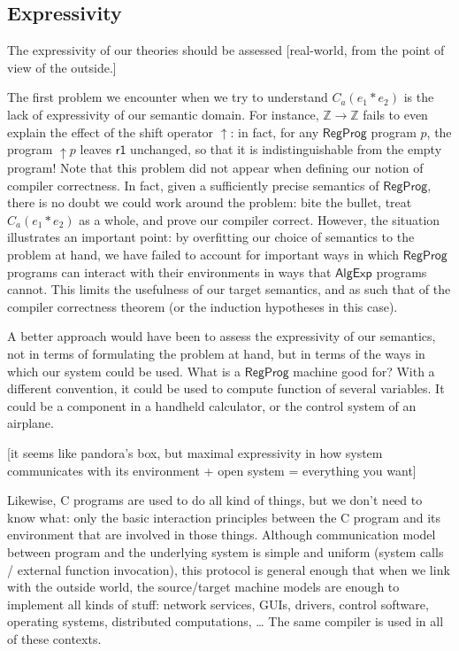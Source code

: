\documentclass[sigplan,10pt,review,anonymous]{acmart}
\newcommand{\kw}[1]{\ensuremath{ \textsf{#1} }}
\begin{document}
{\color{gray} %

\subsection{Expressivity} %

The expressivity of our theories
should be assessed
[real-world,
from the point of view of the outside.]

The first problem we encounter when we try to understand $C_a(e_1 * e_2)$
is the lack of expressivity of our semantic domain.
For instance,
$\mathbb{Z} \rightarrow \mathbb{Z}$
fails to even explain the effect of the shift operator $\uparrow$:
in fact, for any $\kw{RegProg}$ program $p$,
the program ${\uparrow}p$ leaves $\kw{r1}$ unchanged,
so that it is indistinguishable from the empty program!
Note that this problem did not appear
when defining our notion of compiler correctness.
In fact,
given a sufficiently precise semantics of $\kw{RegProg}$,
there is no doubt we could work around the problem:
bite the bullet, treat $C_a(e_1 * e_2)$ as a whole,
and prove our compiler correct.
However,
the situation illustrates an important point:
by overfitting our choice of semantics to the problem at hand,
we have failed to account for important ways in which
$\kw{RegProg}$ programs can interact with their environments
in ways that $\kw{AlgExp}$ programs cannot.
This limits the usefulness of our target semantics,
and as such that of the compiler correctness theorem
(or the induction hypotheses in this case).

A better approach would have been to
assess the expressivity of our semantics,
not in terms of formulating the problem at hand,
but in terms of the ways in which our system
could be used.
What is a $\kw{RegProg}$ machine good for?
With a different convention,
it could be used to compute function of several variables.
It could be a component in a handheld calculator,
or the control system of an airplane.

[it seems like pandora's box,
but maximal expressivity in how system communicates with its environment
+ open system = everything you want]

Likewise, C programs are used to do all kind of things,
but we don't need to know what:
only the basic interaction principles
between the C program and its environment that are involved
in those things.
Although communication model between program
and the underlying system is simple and uniform
(system calls / external function invocation),
this protocol is general enough that
when we link with the outside world,
the source/target machine models are enough to
implement all kinds of stuff:
network services, GUIs, drivers, control software,
operating systems, distributed computations, \ldots
The same compiler is used in all of these contexts.


} %
\end{document}
